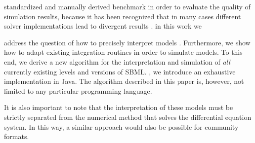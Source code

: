 \documentclass[10pt]{bmc_article}
\newenvironment{bmcformat}{\begin{raggedright}\baselineskip20pt\sloppy\setboolean{publ}{false}}{\end{raggedright}\baselineskip20pt\sloppy}
\begin{document}
\begin{bmcformat}
 standardized and manually derived benchmark
 in order to evaluate the quality of simulation results, because it
has been recognized that in many cases different solver implementations lead to
divergent results \cite{Bergmann2008}.
in this work we
 
 address the question of how to precisely interpret  models .
Furthermore, we show how to adapt existing  integration routines
in order to simulate  models.
To this end, we derive a new algorithm for the  interpretation and 
simulation of \emph{all} currently existing levels and versions of \acs{SBML}.
,
we introduce an exhaustive  implementation in
Java\texttrademark. The algorithm described in this paper
is, however, not limited to any particular programming language.

It is also important to note that the interpretation of these models must be strictly
separated from the numerical method that solves the  differential
equation system. In this way, a similar approach would also be possible for
 community formats.


\end{bmcformat}
\end{document}
